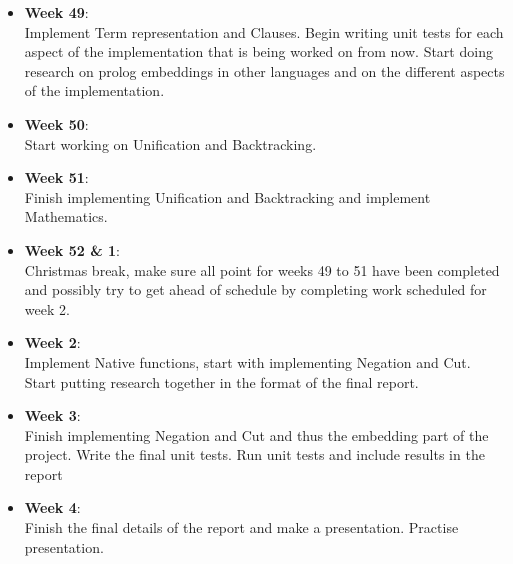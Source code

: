 \documentclass[a4paper]{article}
\begin{document}
\begin{itemize}
\item \textbf{Week 49}:\\
Implement Term representation and Clauses.
Begin writing unit tests for each aspect of the implementation that is being worked on from now.
Start doing research on prolog embeddings in other languages and on the different aspects of the implementation.
\\
\item \textbf{Week 50}:\\
Start working on Unification and Backtracking.
\\
\item \textbf{Week 51}:\\
Finish implementing Unification and Backtracking and implement Mathematics.
\\
\item \textbf{Week 52 \& 1}: \\
Christmas break, make sure all point for weeks 49 to 51 have been completed and possibly try to get ahead of schedule by completing work scheduled for week 2. 
\\
\item \textbf{Week 2}:\\
Implement Native functions, start with implementing Negation and Cut.
Start putting research together in the format of the final report.
\\
\item \textbf{Week 3}:\\
Finish implementing Negation and Cut and thus the embedding part of the project.
Write the final unit tests.
Run unit tests and include results in the report
\\
\item \textbf{Week 4}:\\
Finish the final details of the report and make a presentation. Practise presentation.
\end{itemize}
\end{document}
